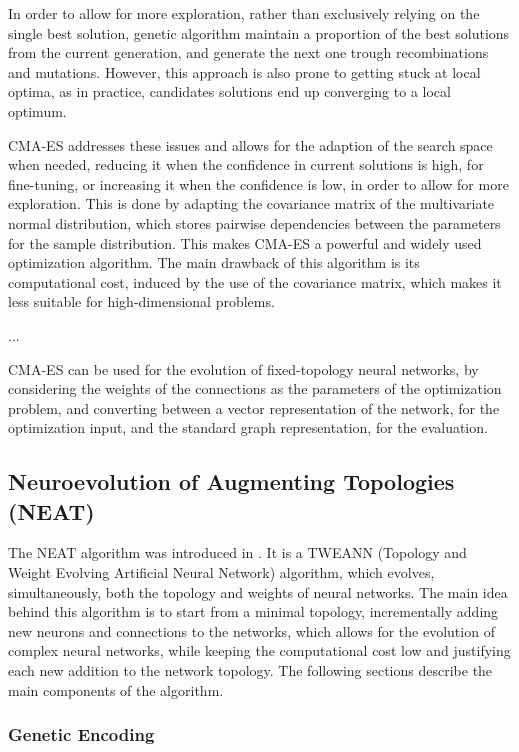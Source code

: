 In order to allow for more exploration, rather than exclusively relying on the single best solution, genetic algorithm maintain a proportion of the best solutions from
the current generation, and generate the next one trough recombinations and mutations. However, this approach is also prone to getting stuck at local optima, as in
practice, candidates solutions end up converging to a local optimum.

CMA-ES addresses these issues and allows for the adaption of the search space when needed, reducing it when the confidence in current solutions is high, for fine-tuning, or
increasing it when the confidence is low, in order to allow for more exploration. This is done by adapting the covariance matrix of the multivariate normal distribution,
which stores pairwise dependencies between the parameters for the sample distribution. This makes CMA-ES a powerful and widely used optimization algorithm. The main drawback
of this algorithm is its computational cost, induced by the use of the covariance matrix, which makes it less suitable for high-dimensional problems.

...


CMA-ES can be used for the evolution of fixed-topology neural networks, by considering the weights of the connections as the parameters of the optimization problem,
and converting between a vector representation of the network, for the optimization input, and the standard graph representation, for the evaluation.

\subsection{Neuroevolution of Augmenting Topologies (NEAT)}

The NEAT algorithm was introduced in \cite{neat}. It is a TWEANN (Topology and Weight Evolving Artificial Neural Network) algorithm, which evolves, simultaneously,  both
the topology and weights of neural networks. The main idea behind this algorithm is to start from a minimal topology, incrementally adding new neurons and connections to
the networks, which allows for the evolution of complex neural networks, while keeping the computational cost low and justifying each new addition to the network topology.
The following sections describe the main components of the algorithm.

\subsubsection{Genetic Encoding}

